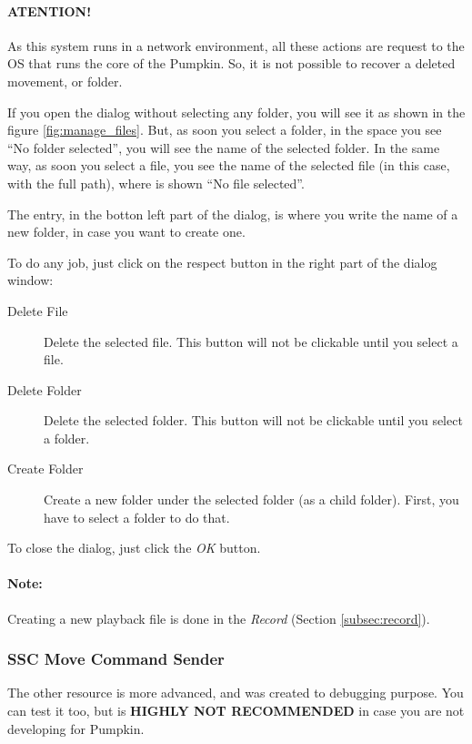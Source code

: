 \documentclass[oneside,a4paper,titlepage]{article}
\begin{document}
{\color{red}
\paragraph{ATENTION!} As this system runs in a network environment, all these actions are request to the OS that runs the core of the Pumpkin. So, it is not possible to recover a deleted movement, or folder.
}

If you open the dialog without selecting any folder, you will see it as shown in the figure \ref{fig:manage_files}. But, as soon you select a folder, in the space you see ``No folder selected'', you will see the name of the selected folder. In the same way, as soon you select a file, you see the name of the selected file (in this case, with the full path), where is shown ``No file selected''.

The entry, in the botton left part of the dialog, is where you write the name of a new folder, in case you want to create one.

To do any job, just click on the respect button in the right part of the dialog window:

\begin{description}
	\item[Delete File] Delete the selected file. This button will not be clickable until you select a file.
	
	\item[Delete Folder] Delete the selected folder. This button will not be clickable until you select a folder.
	
	\item[Create Folder] Create a new folder under the selected folder (as a child folder). First, you have to select a folder to do that.
\end{description}

To close the dialog, just click the \emph{OK} button.

\paragraph{Note: } Creating a new playback file is done in the \emph{Record} (Section \ref{subsec:record}).

\subsubsection{SSC Move Command Sender}

The other resource is more advanced, and was created to debugging purpose. You can test it too, but is \textbf{\color{red} HIGHLY NOT RECOMMENDED} in case you are not developing for Pumpkin.
\end{document}
